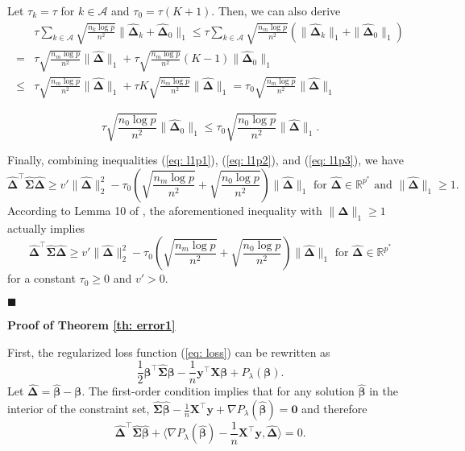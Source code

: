 \documentclass[twoside,12pt]{article}
\newcommand{\mb}[1]{\boldsymbol{\mathbf{#1}}}
\newcommand{\wh}[1]{\widehat{#1}}
\begin{document}
Let $\tau_k=\tau$ for $k\in\mathcal A$ and $\tau_0=\tau(K+1)$.
Then, we can also derive
\begin{equation}
	\label{eq: l1p2}
	\begin{aligned}
		&\tau\sum_{k\in\mathcal A}\sqrt{\frac{n_k\log p}{n^2}}\|\wh{\mb\Delta}_k+\wh{\mb\Delta}_0\|_1\leq \tau \sum_{k\in\mathcal A} \sqrt{\frac{n_m \log p}{n^2}}\left(\|\wh{\mb\Delta}_k\|_1+\|\wh{\mb\Delta}_0\|_1\right)\\
		=& \tau \sqrt{\frac{n_m\log p}{n^2}} \|\wh{\mb\Delta}\|_1+\tau \sqrt{\frac{n_m\log p}{n^2}}(K-1) \|\wh{\mb\Delta}_0\|_1\\
		\leq&\tau \sqrt{\frac{n_m\log p}{n^2}} \|\wh{\mb\Delta}\|_1+\tau K \sqrt{\frac{n_m\log p}{n^2}} \|\wh{\mb\Delta}\|_1=\tau_0 \sqrt{\frac{n_m\log p}{n^2}} \|\wh{\mb\Delta}\|_1
	\end{aligned}
\end{equation}

\begin{equation}
	\label{eq: l1p3}
	\tau\sqrt{\frac{n_0\log p}{n^2}}\|\wh{\mb\Delta}_0\|_1\leq \tau_0\sqrt{\frac{n_0\log p}{n^2}}\|\wh{\mb\Delta}\|_1.
\end{equation}


Finally, combining inequalities (\ref{eq: l1p1}), (\ref{eq: l1p2}), and (\ref{eq: l1p3}), we have 
$$
\wh{\mb\Delta}^\top\wh{\mb\Sigma}\wh{\mb\Delta}\geq v'\|\wh{\boldsymbol{\Delta}}\|_{2}^{2}-\tau_0 \left(\sqrt{\frac{n_m\log p}{n^2}}+\sqrt{\frac{n_0\log p}{n^2}}\right)\|\wh{\boldsymbol{\Delta}}\|_{1} \text { for } \wh{\mb\Delta} \in \mathbb{R}^{p^*} \text { and }\|\wh{\mb\Delta}\|_{1} \geq 1.
$$
According to Lemma 10 of \citet{liu2022multiple}, the aforementioned inequality with $\|\boldsymbol{\Delta}\|_{1} \geq 1$ actually implies 
$$
\wh{\mb\Delta}^\top\wh{\mb\Sigma}\wh{\mb\Delta}\geq v'\|\wh{\boldsymbol{\Delta}}\|_{2}^{2}-\tau_0 \left(\sqrt{\frac{n_m\log p}{n^2}}+\sqrt{\frac{n_0\log p}{n^2}}\right)\|\wh{\boldsymbol{\Delta}}\|_{1} \text { for } \wh{\mb\Delta} \in \mathbb{R}^{p^*}
$$
for a constant $\tau_0\geq 0$ and $v'>0$.

$\blacksquare$

\vskip5mm


\textbf{Proof of Theorem \ref{th: error1}}

First, the regularized loss function (\ref{eq: loss}) can be rewritten as 
$$\frac12\mb\beta^\top\widehat{\mb\Sigma}\mb\beta-\frac{1}{n}\mb y^\top \mb X\mb\beta+P_{\lambda}(\mb\beta).$$
Let $\wh{\mb\Delta}=\wh{\mb\beta}-\mb\beta$. The first-order condition implies that for any solution $\wh{\mb\beta}$ in the interior of the constraint set, $\wh{\mb\Sigma}\wh{\mb\beta}-\frac1n\mb X^\top\mb y +\nabla P_{\lambda}(\wh{\mb\beta})=\mb 0$ and therefore
\begin{equation}
	\label{eq: firstorder}
	\wh{\mb\Delta}^\top\wh{\mb\Sigma}\wh{\mb\beta}+\langle\nabla P_{\lambda}(\wh{\mb\beta})-\frac1n\mb X^\top\mb y, \wh{\mb\Delta}\rangle=0.
\end{equation}
\end{document}
